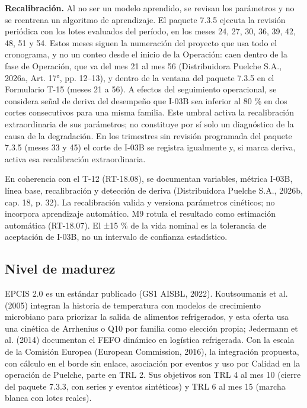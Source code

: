 \textbf{Recalibración.} Al no ser un modelo aprendido, se revisan los parámetros y no se reentrena un algoritmo de aprendizaje. El paquete 7.3.5 ejecuta la revisión periódica con los lotes evaluados del período, en los meses 24, 27, 30, 36, 39, 42, 48, 51 y 54. Estos meses siguen la numeración del proyecto que usa todo el cronograma, y no un conteo desde el inicio de la Operación: caen dentro de la fase de Operación, que va del mes 21 al mes 56 (Distribuidora Puelche S.A., 2026a, Art. 17°, pp. 12–13), y dentro de la ventana del paquete 7.3.5 en el Formulario T-15 (meses 21 a 56). A efectos del seguimiento operacional, se considera señal de deriva del desempeño que I-03B sea inferior al 80 \% en dos cortes consecutivos para una misma familia. Este umbral activa la recalibración extraordinaria de sus parámetros; no constituye por sí solo un diagnóstico de la causa de la degradación. En los trimestres sin revisión programada del paquete 7.3.5 (meses 33 y 45) el corte de I-03B se registra igualmente y, si marca deriva, activa esa recalibración extraordinaria.

En coherencia con el T-12 (RT-18.08), se documentan variables, métrica I-03B, línea base, recalibración y detección de deriva (Distribuidora Puelche S.A., 2026b, cap. 18, p. 32). La recalibración valida y versiona parámetros cinéticos; no incorpora aprendizaje automático. M9 rotula el resultado como estimación automática (RT-18.07). El ±15 \% de la vida nominal es la tolerancia de aceptación de I-03B, no un intervalo de confianza estadístico.

\subsection{Nivel de madurez}

EPCIS 2.0 es un estándar publicado (GS1 AISBL, 2022). Koutsoumanis et al. (2005) integran la historia de temperatura con modelos de crecimiento microbiano para priorizar la salida de alimentos refrigerados, y esta oferta usa una cinética de Arrhenius o Q10 por familia como elección propia; Jedermann et al. (2014) documentan el FEFO dinámico en logística refrigerada. Con la escala de la Comisión Europea (European Commission, 2016), la integración propuesta, con cálculo en el borde sin enlace, asociación por eventos y uso por Calidad en la operación de Puelche, parte en TRL 2. Sus objetivos son TRL 4 al mes 10 (cierre del paquete 7.3.3, con series y eventos sintéticos) y TRL 6 al mes 15 (marcha blanca con lotes reales).

